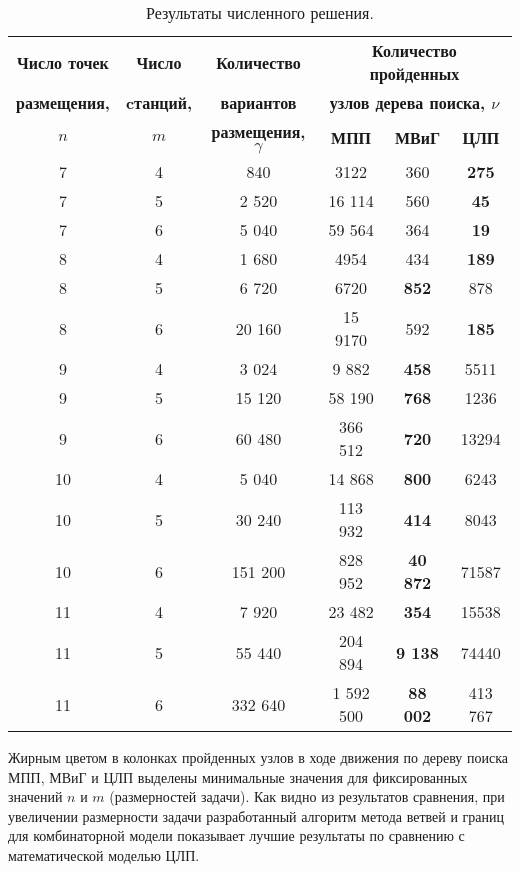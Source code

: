 \begin{table}[b]\centering
  \caption{Результаты численного решения.}\label{tab:models_comparation}
  \begin{tabular}{|ccc|*{3}{c}|} \cline{3-6}
  \hline
  \textbf{Число точек} & \textbf{Число} &\textbf{Количество} & \multicolumn{3}{c|}{\textbf{Количество пройденных}}\\ 
  \textbf{размещения,} & \textbf{cтанций,} & \textbf{вариантов} & \multicolumn{3}{c|}{\textbf{узлов дерева поиска, $\nu$}}\\
  \cline{4-6}
  \textbf{$n$} & \textbf{$m$} &\textbf{размещения, $\gamma$} & \textbf{МПП}& \textbf{МВиГ} & \textbf{ЦЛП} \\ 
  \hline
  7 &  4 & 840 & 3122 & 360 &  \textbf{275} \\
  7 &  5 & 2 520 & 16 114 & 560  &  \textbf{45}  \\
  7 &  6 & 5 040 & 59 564 & 364  &  \textbf{19}  \\
  8 &  4 & 1 680 &  4954 &  434 &   \textbf{189} \\
  8 &  5 & 6 720 & 6720 & \textbf{852}  &  878 \\
  8 &  6 & 20 160 &  15 9170 & 592  & \textbf{185}  \\
  9  &  4 & 3 024 & 9 882 & \textbf{458} & 5511 \\
  9  &  5 & 15 120&  58 190 &  \textbf{768} &  1236\\
  9  &  6 & 60 480&  366 512 &  \textbf{720} & 13294 \\
  10 &  4 & 5 040&  14 868&  \textbf{800}&  6243\\
  10 &	5 & 30 240&  113 932&  \textbf{414}&  8043\\
  10 &	6 & 151 200&  828 952&  \textbf{40 872}&  71587\\
  11 &  4 & 7 920& 23 482&  \textbf{354} & 15538\\
  11 &	5 & 55 440& 204 894& \textbf{9 138}&  74440\\
  11 &	6 & 332 640& 1 592 500 & \textbf{88 002} & 413 767 \\
  \hline
  \end{tabular}
\end{table}

Жирным цветом в колонках пройденных узлов в ходе движения по дереву поиска МПП, МВиГ и ЦЛП выделены минимальные значения для фиксированных значений $n$ и $m$ (размерностей задачи). Как видно из результатов сравнения, при увеличении размерности задачи разработанный алгоритм метода ветвей и границ для комбинаторной модели показывает лучшие результаты по сравнению с математической моделью ЦЛП.

